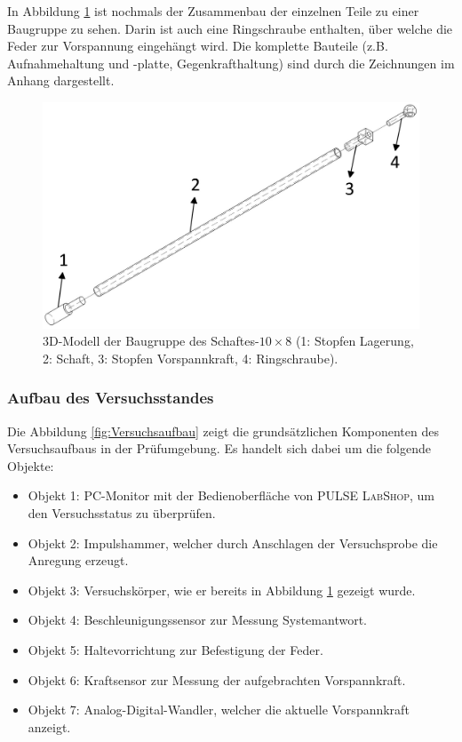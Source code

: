 	
	In Abbildung \ref{fig:Baugruppe-Schaft-10x8} ist nochmals der Zusammenbau der einzelnen Teile zu einer Baugruppe zu sehen. Darin ist auch eine Ringschraube enthalten, über welche die Feder zur Vorspannung eingehängt wird. Die komplette Bauteile (z.B. Aufnahmehaltung und -platte, Gegenkrafthaltung) sind durch die Zeichnungen im Anhang dargestellt.
	
	\begin{figure}[H]
		\centering
		\includegraphics[width=0.85\linewidth, height=0.35\textheight]{Experimentelle_Untersuchungen/Schaft_10x8_Baugruppe}
		\caption{3D-Modell der Baugruppe des Schaftes-$ 10\times8 $ (1: Stopfen Lagerung, 2: Schaft, 3: Stopfen Vorspannkraft, 4: Ringschraube).}
		\label{fig:Baugruppe-Schaft-10x8}
	\end{figure}
	

	
	
	
	\subsubsection{Aufbau des Versuchsstandes}\label{sec:Aufbau des Versuchsstandes}
	
	Die Abbildung \ref{fig:Versuchsaufbau} zeigt die grundsätzlichen Komponenten des Versuchsaufbaus in der Prüfumgebung. Es handelt sich dabei um die folgende Objekte:
	\begin{itemize}
		\item Objekt 1: PC-Monitor mit der Bedienoberfläche von \textsc{PULSE LabShop}, um den Versuchsstatus zu überprüfen.
		\item Objekt 2: Impulshammer, welcher durch Anschlagen der Versuchsprobe die Anregung erzeugt.
		\item Objekt 3: Versuchskörper, wie er bereits in Abbildung \ref{fig:Baugruppe-Schaft-10x8} gezeigt wurde.
		\item Objekt 4: Beschleunigungssensor zur Messung Systemantwort.
		\item Objekt 5: Haltevorrichtung zur Befestigung der Feder.
		\item Objekt 6: Kraftsensor zur Messung der aufgebrachten Vorspannkraft.
		\item Objekt 7: Analog-Digital-Wandler, welcher die aktuelle Vorspannkraft anzeigt.
	\end{itemize}
	
